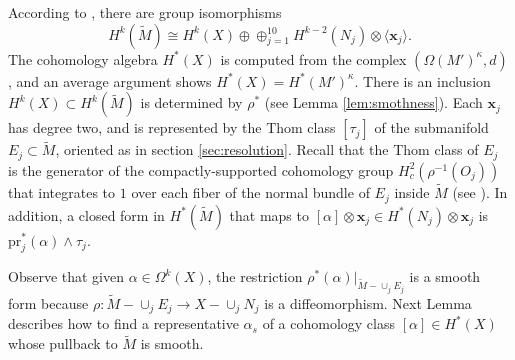 \documentclass[10pt]{article}
\newcommand{\la}{\langle}
\newcommand{\ra}{\rangle}
\theoremstyle{plain}
\theoremstyle{definition}
\theoremstyle{remark}
\begin{document}
According to \cite[Proposition 6.1]{JK}, there are group isomorphisms 
\begin{equation} \label{eqn:cohom}
H^k(\widetilde{M})\cong H^k(X)\oplus \oplus_{j=1}^{10} H^{k-2}(N_j)\otimes \la \mathbf{x}_j\ra.
\end{equation}
The cohomology algebra $H^*(X)$ is computed from the complex $(\Omega(M')^{\kappa},d)$, and an average argument shows $H^*(X)=H^*(M')^{\kappa}$. There is an inclusion $H^k(X)\subset H^k(\widetilde{M})$ is determined by $\rho^*$ (see Lemma \ref{lem:smothness}). 
Each $\mathbf{x}_j$ has degree two, and is represented by the Thom class $[\tau_j]$ of the submanifold $E_j\subset \widetilde{M}$, oriented as in section \ref{sec:resolution}. Recall that the Thom class of $E_j$ is the generator of the compactly-supported cohomology group
$H_c^2(\rho^{-1}(O_j))$ that integrates to $1$ over each fiber of the normal bundle of $E_j$ inside $\widetilde{M}$ (see \cite[Proposition 6.18]{Bott-Tu}).  In addition, a closed form in $H^*(\widetilde{M})$ that maps to $[\alpha] \otimes \mathbf{x}_j\in H^*(N_j)\otimes  \mathbf{x}_j$ is $\mathrm{pr}_j^*(\alpha) \wedge \tau_j$.



Observe that given $\alpha \in \Omega^k(X)$, the restriction $\rho^*(\alpha)|_{\widetilde{M}-\cup_j E_j}$ is a smooth form because $\rho \colon \widetilde{M}-\cup_j E_j \to X-\cup_j N_j$ is a diffeomorphism. Next Lemma describes how to find a representative $\alpha_s$ of a cohomology class $[\alpha] \in H^*(X)$ whose pullback to $\widetilde{M}$ is smooth.
\end{document}
